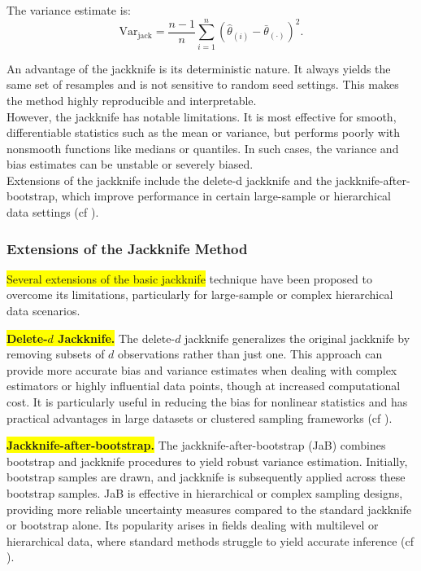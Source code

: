 \documentclass[aodsor,preprint]{imsart}
\numberwithin{equation}{section}
\theoremstyle{plain}
\begin{document}
The variance estimate is:
\[
\text{Var}_{\text{jack}} = \frac{n - 1}{n} \sum_{i=1}^{n} (\hat{\theta}_{(i)} - \bar{\theta}_{(\cdot)})^2.
\]

An advantage of the jackknife is its deterministic nature. It always yields the same set of resamples and is not sensitive to random seed settings. This makes the method highly reproducible and interpretable. \\

However, the jackknife has notable limitations. It is most effective for smooth, differentiable statistics such as the mean or variance, but performs poorly with nonsmooth functions like medians or quantiles. In such cases, the variance and bias estimates can be unstable or severely biased. \\

Extensions of the jackknife include the delete-d jackknife and the jackknife-after-bootstrap, which improve performance in certain large-sample or hierarchical data settings (cf \cite{shao1995jackknife,efron1993introduction}). \\

\subsubsection*{Extensions of the Jackknife Method}

 \colorbox{yellow}{Several extensions of the basic jackknife} technique have been proposed to overcome its limitations, particularly for large-sample or complex hierarchical data scenarios.

\colorbox{yellow}{ \textbf{Delete-\( d \) Jackknife.}} The delete-\( d \) jackknife generalizes the original jackknife by removing subsets of \( d \) observations rather than just one. This approach can provide more accurate bias and variance estimates when dealing with complex estimators or highly influential data points, though at increased computational cost. It is particularly useful in reducing the bias for nonlinear statistics and has practical advantages in large datasets or clustered sampling frameworks (cf \cite{shao1995jackknife,wu1986jackknife}).

\colorbox{yellow}{ \textbf{Jackknife-after-bootstrap.}} The jackknife-after-bootstrap (JaB) combines bootstrap and jackknife procedures to yield robust variance estimation. Initially, bootstrap samples are drawn, and jackknife is subsequently applied across these bootstrap samples. JaB is effective in hierarchical or complex sampling designs, providing more reliable uncertainty measures compared to the standard jackknife or bootstrap alone. Its popularity arises in fields dealing with multilevel or hierarchical data, where standard methods struggle to yield accurate inference (cf \cite{efron1993introduction,davison1997bootstrap}).
\end{document}
